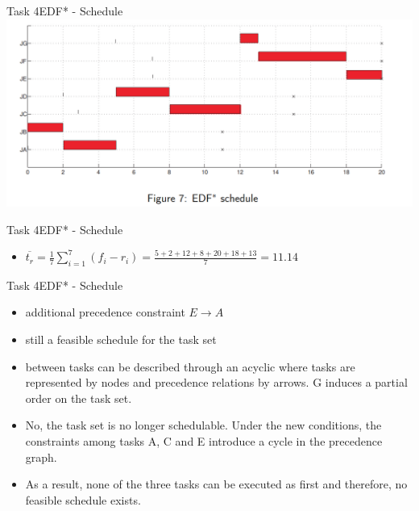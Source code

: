 \begin{frame}{Task 4}{EDF* - Schedule}
    \includegraphics[width = \linewidth]{figures/edf-star-schedule-2.PNG}
\end{frame}

\begin{frame}[allowframebreaks]{Task 4}{EDF* - Schedule}
  \begin{solution}
  \begin{itemize}
    \item $\displaystyle \overline{t_r}=\frac{1}{7} \sum_{i=1}^7\left(f_i-r_i\right)=\frac{5+2+12+8+20+18+13}{7}=11.14$
  \end{itemize}
  \end{solution}
\end{frame}

\begin{frame}[allowframebreaks]{Task 4}{EDF* - Schedule}
  \begin{tasknoinc}
    \begin{itemize}
      \item additional precedence constraint $E \rightarrow A$
      \item still a \alert{feasible schedule} for the task set
    \end{itemize}
  \end{tasknoinc}
  \begin{requirementsnoinc}
    \begin{itemize}
      \item {} between tasks can be described through an \alert{acyclic}  where tasks are represented by nodes and precedence relations by arrows. G induces a partial order on the task set.
    \end{itemize}
  \end{requirementsnoinc}
  \begin{solutionnoinc}
    \begin{itemize}
      \item No, the task set is no longer schedulable. Under the new conditions, the constraints among tasks A, C
and E introduce a cycle in the precedence graph.
      \item As a result, none of the three tasks can be executed as first and therefore, no feasible schedule exists.
    \end{itemize}
  \end{solutionnoinc}
\end{frame}
